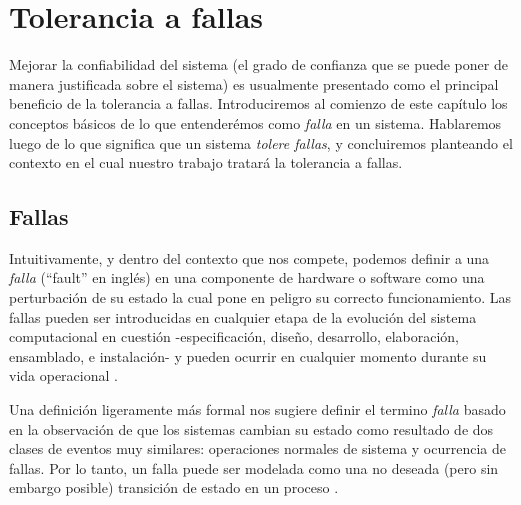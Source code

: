 \documentclass[titlepage, 12pt]{book}
\begin{document}









\chapter{Tolerancia a fallas}

Mejorar la confiabilidad del sistema (el grado de confianza que se puede poner 
de manera justificada sobre el sistema) es usualmente presentado como el 
principal beneficio de la tolerancia a fallas. Introduciremos al comienzo de este cap\'itulo los conceptos b\'asicos de lo que entender\'emos como \textit{falla} en un sistema. Hablaremos luego de lo que significa que un sistema \textit{tolere fallas}, y concluiremos planteando el contexto en el cual nuestro trabajo tratar\'a la tolerancia a fallas.






\section{Fallas}
Intuitivamente, y dentro del contexto que nos compete, podemos definir a una \textit{falla} (``fault'' en ingl\'es) en una componente de hardware o software como una perturbaci\'on de su estado la cual pone en peligro su correcto funcionamiento. Las fallas pueden ser introducidas en cualquier etapa de la evoluci\'on del sistema computacional en cuesti\'on -especificaci\'on, dise\~no, desarrollo, elaboraci\'on, ensamblado, e instalaci\'on- y pueden ocurrir en cualquier momento durante su vida operacional \cite{FaultInject}.

Una definici\'on ligeramente m\'as formal nos sugiere definir el termino \textit{falla} basado en la observaci\'on de que los sistemas cambian su estado como resultado de dos clases de eventos muy similares: operaciones normales de sistema y ocurrencia de fallas. Por lo tanto, un falla puede ser modelada como una no deseada (pero sin embargo posible) transici\'on de estado en un proceso \cite{Felix}.
\end{document}
